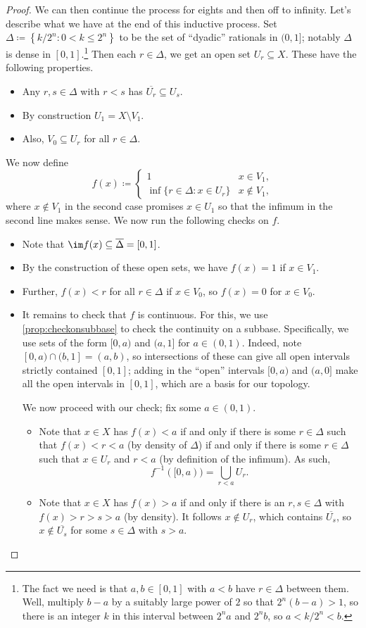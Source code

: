 \documentclass[../notes.tex]{subfiles}
\begin{document}
\begin{proof}
	We can then continue the process for eights and then off to infinity. Let's describe what we have at the end of this inductive process. Set $\Delta\coloneqq\left\{k/2^n:0< k\le 2^n\right\}$ to be the set of ``dyadic'' rationals in $(0,1]$; notably $\Delta$ is dense in $[0,1]$.\footnote{The fact we need is that $a,b\in[0,1]$ with $a<b$ have $r\in\Delta$ between them. Well, multiply $b-a$ by a suitably large power of $2$ so that $2^n(b-a)>1$, so there is an integer $k$ in this interval between $2^na$ and $2^nb$, so $a<k/2^n<b$.} Then each $r\in\Delta$, we get an open set $U_r\subseteq X$. These have the following properties.
	\begin{itemize}
		\item Any $r,s\in\Delta$ with $r<s$ has $\overline{U_r}\subseteq U_s$.
		\item By construction $U_1=X\setminus V_1$.
		\item Also, $V_0\subseteq U_r$ for all $r\in\Delta$.
	\end{itemize}
	We now define
	\[f(x)\coloneqq\begin{cases}
		1 & x\in V_1, \\
		\inf\{r\in\Delta:x\in U_r\} & x\notin V_1,
	\end{cases}\]
	where $x\notin V_1$ in the second case promises $x\in U_1$ so that the infimum in the second line makes sense. We now run the following checks on $f$.
	\begin{itemize}
		\item Note that $\im f(x)\subseteq\overline\Delta=[0,1]$.
		\item By the construction of these open sets, we have $f(x)=1$ if $x\in V_1$.
		\item Further, $f(x)<r$ for all $r\in\Delta$ if $x\in V_0$, so $f(x)=0$ for $x\in V_0$.
		\item It remains to check that $f$ is continuous. For this, we use \autoref{prop:checkonsubbase} to check the continuity on a subbase. Specifically, we use sets of the form $[0,a)$ and $(a,1]$ for $a\in(0,1)$. Indeed, note $[0,a)\cap(b,1]=(a,b)$, so intersections of these can give all open intervals strictly contained $[0,1]$; adding in the ``open'' intervals $[0,a)$ and $(a,0]$ make all the open intervals in $[0,1]$, which are a basis for our topology.
		
		We now proceed with our check; fix some $a\in(0,1)$.
		\begin{itemize}
			\item Note that $x\in X$ has $f(x)<a$ if and only if there is some $r\in\Delta$ such that $f(x)<r<a$ (by density of $\Delta$) if and only if there is some $r\in\Delta$ such that $x\in U_r$ and $r<a$ (by definition of the infimum). As such,
			\[f^{-1}([0,a))=\bigcup_{r<a}U_r.\]
			\item Note that $x\in X$ has $f(x)>a$ if and only if there is an $r,s\in\Delta$ with $f(x)>r>s>a$ (by density). It follows $x\notin U_r$, which contains $\overline{U_s}$, so $x\notin\overline{U_s}$ for some $s\in\Delta$ with $s>a$.
			

\end{itemize}
\end{itemize}
\end{proof}
\end{document}
